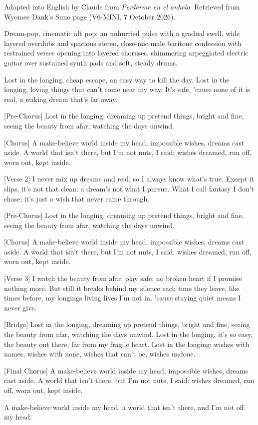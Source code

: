 \begin{notes}
Adapted into English by Claude from \emph{Perderme en el anhelo}. Retrieved from Wyomee Dank's Suno page (V6-MINI, 7 October 2026).
\end{notes}
\begin{style}
Dream-pop, cinematic alt pop; an unhurried pulse with a gradual swell, wide layered overdubs and spacious stereo, close-mic male baritone confession with restrained verses opening into layered choruses, shimmering arpeggiated electric guitar over sustained synth pads and soft, steady drums.
\end{style}
\begin{lyrics}
[Verse 1]
Lost in the longing, cheap escape,
an easy way to kill the day.
Lost in the longing, loving things
that can't come near my way.
It's safe, 'cause none of it is real,
a waking dream that's far away.

[Pre-Chorus]
Lost in the longing, dreaming up
pretend things, bright and fine,
seeing the beauty from afar,
watching the days unwind.

[Chorus]
A make-believe world inside my head,
impossible wishes, dreams cast aside.
A world that isn't there, but I'm not nuts, I said:
wishes dreamed, run off, worn out, kept inside.

[Verse 2]
I never mix up dreams and real,
so I always know what's true.
Except it slips, it's not that clean:
a dream's not what I pursue.
What I call fantasy I don't chase;
it's just a wish that never came through.

[Pre-Chorus]
Lost in the longing, dreaming up
pretend things, bright and fine,
seeing the beauty from afar,
watching the days unwind.

[Chorus]
A make-believe world inside my head,
impossible wishes, dreams cast aside.
A world that isn't there, but I'm not nuts, I said:
wishes dreamed, run off, worn out, kept inside.

[Verse 3]
I watch the beauty from afar, play safe:
no broken heart if I promise nothing more.
But still it breaks behind my silence
each time they leave, like times before,
my longings living lives I'm not in,
'cause staying quiet means I never give.

[Bridge]
Lost in the longing, dreaming up
pretend things, bright and fine,
seeing the beauty from afar,
watching the days unwind.
Lost in the longing, it's so easy,
the beauty out there, far from my fragile heart.
Lost in the longing:
wishes with names, wishes with none,
wishes that can't be, wishes undone.

[Final Chorus]
A make-believe world inside my head,
impossible wishes, dreams cast aside.
A world that isn't there, but I'm not nuts, I said:
wishes dreamed, run off, worn out, kept inside.

A make-believe world inside my head,
a world that isn't there,
and I'm not off my head.
\end{lyrics}

